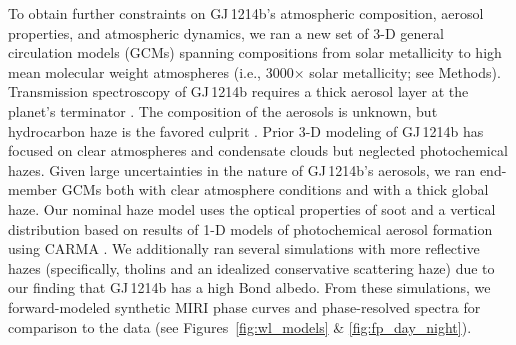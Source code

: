 \documentclass[pdflatex,sn-standardnature]{sn-jnl}%
\begin{document}





To obtain further constraints on GJ\,1214b's atmospheric composition, aerosol properties, and atmospheric dynamics, we ran a new set of 3-D general circulation models (GCMs) spanning compositions from solar metallicity to high mean molecular weight atmospheres (i.e., 3000$\times$ solar metallicity; see Methods).  Transmission spectroscopy of GJ\,1214b requires a thick aerosol layer at the planet's terminator \cite{kreidberg14}.  The composition of the aerosols is unknown, but hydrocarbon haze is the favored culprit \cite{morley15,kawashima19b,adams19,lavvas19,gao20b}.   Prior 3-D modeling of GJ\,1214b has focused on clear atmospheres \citep{kataria14} and condensate clouds \cite{charnay15b,charnay15,christie22} but neglected photochemical hazes. Given large uncertainties in the nature of GJ\,1214b's aerosols, we ran end-member GCMs both with clear atmosphere conditions and with a thick global haze.  Our nominal haze model uses the optical properties of soot \citep{lavvas17} and a vertical distribution based on results of 1-D models of photochemical aerosol formation using CARMA \cite{toon1979,ackerman1995}.  We additionally ran several simulations with more reflective hazes (specifically, tholins \citep{khare84} and an idealized conservative scattering haze) due to our finding that GJ\,1214b has a high Bond albedo.  From these simulations, we forward-modeled synthetic MIRI phase curves and phase-resolved spectra for comparison to the data (see Figures~\ref{fig:wl_models} \& \ref{fig:fp_day_night}).  
\end{document}
